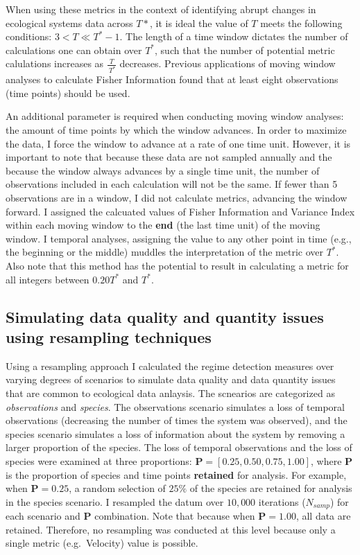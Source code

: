 \documentclass[12pt,twoside,openany]{reedthesis}
\begin{document}
When using these metrics in the context of identifying abrupt changes in ecological systems data across \(T*\), it is ideal the value of \(T\) meets the following conditions: \(3 < T \ll T^*-1\). The length of a time window dictates the number of calculations one can obtain over \(T^*\), such that the number of potential metric calulations increases as \(\frac{T}{\ T^*}\) decreases. Previous applications of moving window analyses to calculate Fisher Information found that at least eight observations (time points) should be used.

An additional parameter is required when conducting moving window analyses: the amount of time points by which the window advances. In order to maximize the data, I force the window to advance at a rate of one time unit. However, it is important to note that because these data are not sampled annually and the because the window always advances by a single time unit, the number of observations included in each calculation will not be the same. If fewer than 5 observations are in a window, I did not calculate metrics, advancing the window forward.
I assigned the calcuated values of Fisher Information and Variance Index within each moving window to the \textbf{end} (the last time unit) of the moving window. I temporal analyses, assigning the value to any other point in time (e.g., the beginning or the middle) muddles the interpretation of the metric over \(T^*\). Also note that this method has the potential to result in calculating a metric for all integers between \(0.20 T^*\) and \(T^*\).

\hypertarget{simulating-data-quality-and-quantity-issues-using-resampling-techniques}{%
\subsection{Simulating data quality and quantity issues using resampling techniques}\label{simulating-data-quality-and-quantity-issues-using-resampling-techniques}}

Using a resampling approach I calculated the regime detection measures over varying degrees of scenarios to simulate data quality and data quantity issues that are common to ecological data anlaysis. The scnearios are categorized as \emph{observations} and \emph{species}. The observations scenario simulates a loss of temporal observations (decreasing the number of times the system was observed), and the species scenario simulates a loss of information about the system by removing a larger proportion of the species. The loss of temporal observations and the loss of species were examined at three proportions: \(\textbf{P} = [0.25, 0.50, 0.75, 1.00]\), where \(\textbf{P}\) is the proportion of species and time points \textbf{retained} for analysis. For example, when \(\textbf{P} = 0.25\), a random selection of \(25\%\) of the species are retained for analysis in the species scenario. I resampled the datum over \(10,000\) iterations (\(N_{samp}\)) for each scenario and \(\textbf{P}\) combination. Note that because when \(\textbf{P} = 1.00\), all data are retained. Therefore, no resampling was conducted at this level because only a single metric (e.g.~Velocity) value is possible.
\end{document}

